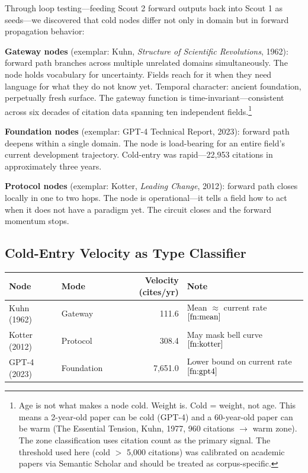 \documentclass[11pt]{article}
\begin{document}
Through loop testing---feeding Scout 2 forward outputs back into Scout 1 as seeds---we discovered that cold nodes differ not only in domain but in forward propagation behavior:

\textbf{Gateway nodes} (exemplar: Kuhn, \textit{Structure of Scientific Revolutions}, 1962): forward path branches across multiple unrelated domains simultaneously. The node holds vocabulary for uncertainty. Fields reach for it when they need language for what they do not know yet. Temporal character: ancient foundation, perpetually fresh surface. The gateway function is time-invariant---consistent across six decades of citation data spanning ten independent fields.\footnote{\label{fn:cold-age}Age is not what makes a node cold. Weight is. Cold = weight, not age. This means a 2-year-old paper can be cold (GPT-4) and a 60-year-old paper can be warm (The Essential Tension, Kuhn, 1977, 960 citations $\to$ warm zone). The zone classification uses citation count as the primary signal. The threshold used here (cold $>$ 5,000 citations) was calibrated on academic papers via Semantic Scholar and should be treated as corpus-specific.}

\textbf{Foundation nodes} (exemplar: GPT-4 Technical Report, 2023): forward path deepens within a single domain. The node is load-bearing for an entire field's current development trajectory. Cold-entry was rapid---22,953 citations in approximately three years.

\textbf{Protocol nodes} (exemplar: Kotter, \textit{Leading Change}, 2012): forward path closes locally in one to two hops. The node is operational---it tells a field how to act when it does not have a paradigm yet. The circuit closes and the forward momentum stops.

\subsection{Cold-Entry Velocity as Type Classifier}

\begin{center}
\begin{tabular}{llrp{4.5cm}}
\toprule
\textbf{Node} & \textbf{Mode} & \textbf{Velocity (cites/yr)} & \textbf{Note} \\
\midrule
Kuhn (1962) & Gateway & 111.6 & Mean $\approx$ current rate$^{\ref{fn:mean}}$ \\
Kotter (2012) & Protocol & 308.4 & May mask bell curve$^{\ref{fn:kotter}}$ \\
GPT-4 (2023) & Foundation & 7,651.0 & Lower bound on current rate$^{\ref{fn:gpt4}}$ \\
\bottomrule
\end{tabular}
\end{center}
\end{document}
